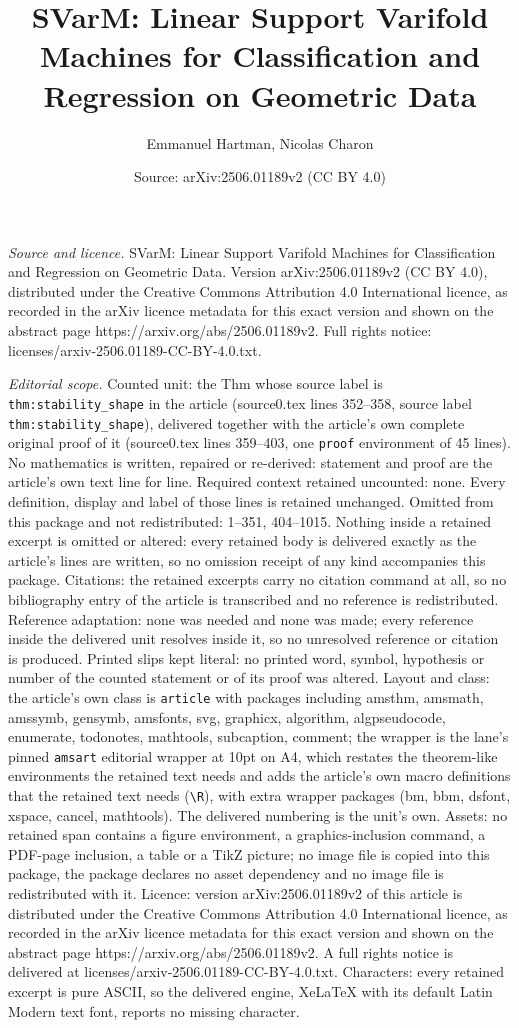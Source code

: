\documentclass[10pt,a4paper]{amsart}
\title[SVarM: Linear Support Varifold Machines for Classification a]{SVarM: Linear Support Varifold Machines for Classification and Regression on Geometric Data}
\author{Emmanuel Hartman, Nicolas Charon}
\date{Source: arXiv:2506.01189v2 (CC BY 4.0)}
\begin{document}
\maketitle

\noindent\emph{Source and licence.} SVarM: Linear Support Varifold Machines for Classification and Regression on Geometric Data. Version arXiv:2506.01189v2 (CC BY 4.0), distributed under the Creative Commons Attribution 4.0 International licence, as recorded in the arXiv licence metadata for this exact version and shown on the abstract page https://arxiv.org/abs/2506.01189v2. Full rights notice: licenses/arxiv-2506.01189-CC-BY-4.0.txt.\par\smallskip

\noindent\textit{Editorial scope.} Counted unit: the Thm whose source label is \texttt{thm:stability\_shape} in the article (source0.tex lines 352--358, source label \texttt{thm:stability\_shape}), delivered together with the article's own complete original proof of it (source0.tex lines 359--403, one \texttt{proof} environment of 45 lines). No mathematics is written, repaired or re-derived: statement and proof are the article's own text line for line. Required context retained uncounted: none. Every definition, display and label of those lines is retained unchanged. Omitted from this package and not redistributed: 1--351, 404--1015. Nothing inside a retained excerpt is omitted or altered: every retained body is delivered exactly as the article's lines are written, so no omission receipt of any kind accompanies this package. Citations: the retained excerpts carry no citation command at all, so no bibliography entry of the article is transcribed and no reference is redistributed. Reference adaptation: none was needed and none was made; every reference inside the delivered unit resolves inside it, so no unresolved reference or citation is produced. Printed slips kept literal: no printed word, symbol, hypothesis or number of the counted statement or of its proof was altered. Layout and class: the article's own class is \texttt{article} with packages including amsthm, amsmath, amssymb, gensymb, amsfonts, svg, graphicx, algorithm, algpseudocode, enumerate, todonotes, mathtools, subcaption, comment; the wrapper is the lane's pinned \texttt{amsart} editorial wrapper at 10pt on A4, which restates the theorem-like environments the retained text needs and adds the article's own macro definitions that the retained text needs (\texttt{\textbackslash R}), with extra wrapper packages (bm, bbm, dsfont, xspace, cancel, mathtools). The delivered numbering is the unit's own. Assets: no retained span contains a figure environment, a graphics-inclusion command, a PDF-page inclusion, a table or a TikZ picture; no image file is copied into this package, the package declares no asset dependency and no image file is redistributed with it. Licence: version arXiv:2506.01189v2 of this article is distributed under the Creative Commons Attribution 4.0 International licence, as recorded in the arXiv licence metadata for this exact version and shown on the abstract page https://arxiv.org/abs/2506.01189v2. A full rights notice is delivered at licenses/arxiv-2506.01189-CC-BY-4.0.txt. Characters: every retained excerpt is pure ASCII, so the delivered engine, XeLaTeX with its default Latin Modern text font, reports no missing character.
\end{document}
